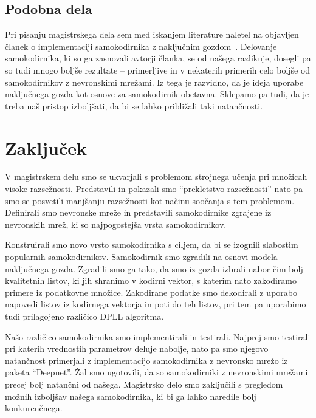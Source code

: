 \documentclass[12pt,a4paper,twoside]{article}
\theoremstyle{definition} %
\theoremstyle{plain} %
\numberwithin{equation}{section}  %
\begin{document}
\subsection{Podobna dela}

Pri pisanju magistrskega dela sem med iskanjem literature naletel na objavljen članek o implementaciji samokodirnika z naključnim gozdom~\cite{feng2018autoencoder}.
Delovanje samokodirnika, ki so ga zasnovali avtorji članka, se od našega razlikuje, dosegli pa so tudi mnogo boljše rezultate -- primerljive in v nekaterih primerih celo boljše od samokodirnikov z nevronskimi mrežami.
Iz tega je razvidno, da je ideja uporabe naključnega gozda kot osnove za samokodirnik obetavna.
Sklepamo pa tudi, da je treba naš pristop izboljšati, da bi se lahko približali taki natančnosti.


\section{Zaključek}  

V magistrskem delu smo se ukvarjali s problemom strojnega učenja pri množicah visoke razsežnosti.
Predstavili in pokazali smo ``prekletstvo razsežnosti'' nato pa smo se posvetili manjšanju razsežnosti kot načinu soočanja s tem problemom.
Definirali smo nevronske mreže in predstavili samokodirnike zgrajene iz nevronskih mrež, ki so najpogostejša vrsta samokodirnikov.

Konstruirali smo novo vrsto samokodirnika s ciljem, da bi se izognili slabostim popularnih samokodirnikov.
Samokodirnik smo zgradili na osnovi modela naključnega gozda.
Zgradili smo ga tako, da smo iz gozda izbrali nabor čim bolj kvalitetnih listov, ki jih shranimo v kodirni vektor, s katerim nato zakodiramo primere iz podatkovne množice.
Zakodirane podatke smo dekodirali z uporabo napovedi listov iz kodirnega vektorja in poti do teh listov, pri tem pa uporabimo tudi prilagojeno različico DPLL algoritma.

Našo različico samokodirnika smo implementirali in testirali.
Najprej smo testirali pri katerih vrednostih parametrov deluje nabolje, nato pa smo njegovo natančnost primerjali z implementacijo samokodirnika z nevronsko mrežo iz paketa ``Deepnet''.
Žal smo ugotovili, da so samokodirniki z nevronskimi mrežami precej bolj natančni od našega.
Magistrsko delo smo zaključili s pregledom možnih izboljšav našega samokodirnika, ki bi ga lahko naredile bolj konkurenčnega.
\end{document}
